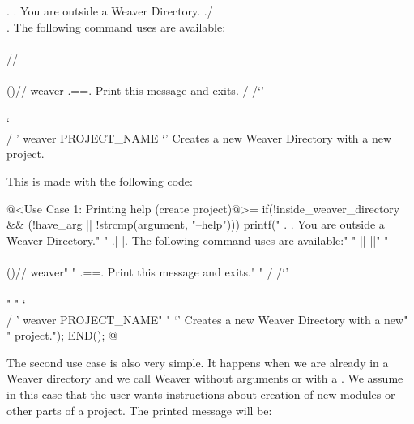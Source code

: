 {\alinhaverbatim
    .  .   You are outside a Weaver Directory.
   ./  \\.  The following command uses are available:
   \\\\  //
   \\\\()//  weaver
   .={}=.      Print this message and exits.
  / /`'\\ \\
  ` \\  / '  weaver PROJECT_NAME
     `'        Creates a new Weaver Directory with a new
               project.
\alinhanormal

This is made with the following code:

\iniciocodigo
@<Use Case 1: Printing help (create project)@>=
if(!inside_weaver_directory && (!have_arg || !strcmp(argument, "--help"))){
  printf("    .  .     You are outside a Weaver Directory.\n"
  "   .|  |.    The following command uses are available:\n"
  "   ||  ||\n"
  "   \\\\()//  weaver\n"
  "   .={}=.      Print this message and exits.\n"
  "  / /`'\\ \\\n"
  "  ` \\  / '  weaver PROJECT_NAME\n"
  "     `'        Creates a new Weaver Directory with a new\n"
  "               project.\n");
  END();
}
@
\fimcodigo



The second use case is also very simple. It happens when we are
already in a Weaver directory and we call Weaver without arguments or
with a . We assume in this case that the user wants
instructions about creation of new modules or other parts of a
project. The printed message will be:

}
